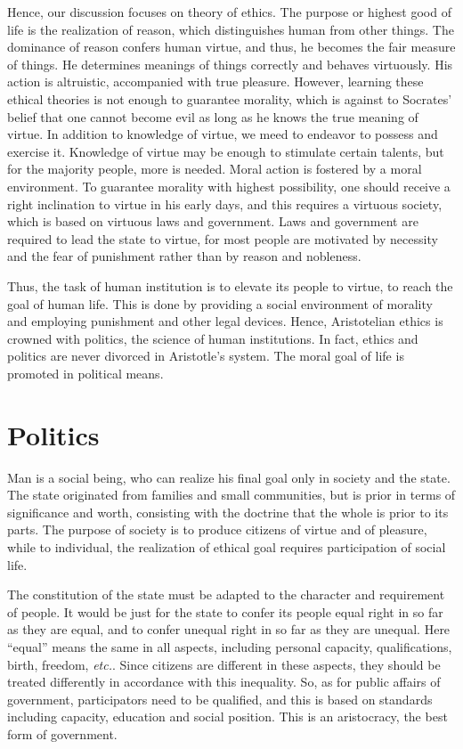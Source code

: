 \documentclass[11pt]{article}
\begin{document}
Hence, our discussion focuses on theory of ethics. 
The purpose or highest good of life is the realization of reason, which distinguishes human from other things. 
The dominance of reason confers human virtue, and thus, he becomes the fair measure of things. 
He determines meanings of things correctly and behaves virtuously. 
His action is altruistic, accompanied with true pleasure. 
However, learning these ethical theories is not enough to guarantee morality, which is against to Socrates’ belief that one cannot become evil as long as he knows the true meaning of virtue. 
In addition to knowledge of virtue, we meed to endeavor to possess and exercise it. 
Knowledge of virtue may be enough to stimulate certain talents, but for the majority people, more is needed. 
Moral action is fostered by a moral environment. 
To guarantee morality with highest possibility, one should receive a right inclination to virtue in his early days, and this requires a virtuous society, which is based on virtuous laws and government. 
Laws and government are required to lead the state to virtue, for most people are motivated by necessity and the fear of punishment rather than by reason and nobleness.

\newline

Thus, the task of human institution is to elevate its people to virtue, to reach the goal of human life. 
This is done by providing a social environment of morality and employing punishment and other legal devices. 
Hence, Aristotelian ethics is crowned with politics, the science of human institutions. 
In fact, ethics and politics are never divorced in Aristotle’s system. 
The moral goal of life is promoted in political means.

\section{Politics}
Man is a social being, who can realize his final goal only in society and the state. 
The state originated from families and small communities, but is prior in terms of significance and worth, consisting with the doctrine that the whole is prior to its parts. 
The purpose of society is to produce citizens of virtue and of pleasure, while to individual, the realization of ethical goal requires participation of social life.

\newline

The constitution of the state must be adapted to the character and requirement of people. 
It would be just for the state to confer its people equal right in so far as they are equal, and to confer unequal right in so far as they are unequal. 
Here “equal” means the same in all aspects, including personal capacity, qualifications, birth, freedom, \textit{etc.}. 
Since citizens are different in these aspects, they should be treated differently in accordance with this inequality. 
So, as for public affairs of government, participators need to be qualified, and this is based on standards including capacity, education and social position. 
This is an aristocracy, the best form of government. 
\end{document}
